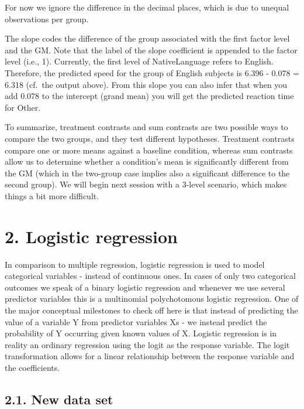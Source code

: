 \documentclass[
]{article}
\begin{document}
For now we ignore the difference in the decimal places, which is due to
unequal observations per group.

The slope codes the difference of the group associated with the first
factor level and the GM. Note that the label of the slope coefficient is
appended to the factor level (i.e., 1). Currently, the first level of
NativeLanguage refers to English. Therefore, the predicted speed for the
group of English subjects is 6.396 - 0.078 = 6.318 (cf.~the output
above). From this slope you can also infer that when you add 0.078 to
the intercept (grand mean) you will get the predicted reaction time for
Other.

To summarize, treatment contrasts and sum contrasts are two possible
ways to compare the two groups, and they test different hypotheses.
Treatment contrasts compare one or more means against a baseline
condition, whereas sum contrasts allow us to determine whether a
condition's mean is significantly different from the GM (which in the
two-group case implies also a significant difference to the second
group). We will begin next session with a 3-level scenario, which makes
things a bit more difficult.

\hypertarget{logistic-regression}{%
\section{2. Logistic regression}\label{logistic-regression}}

In comparison to multiple regression, logistic regression is used to
model categorical variables - instead of continuous ones. In cases of
only two categorical outcomes we speak of a binary logistic regression
and whenever we use several predictor variables this is a multinomial
\textbar{} polychotomous logistic regression. One of the major
conceptual milestones to check off here is that instead of predicting
the value of a variable Y from predictor variables Xs - we instead
predict the probability of Y occurring given known values of X. Logistic
regression is in reality an ordinary regression using the logit as the
response variable. The logit transformation allows for a linear
relationship between the response variable and the coefficients.

\hypertarget{new-data-set}{%
\subsection{2.1. New data set}\label{new-data-set}}
\end{document}
